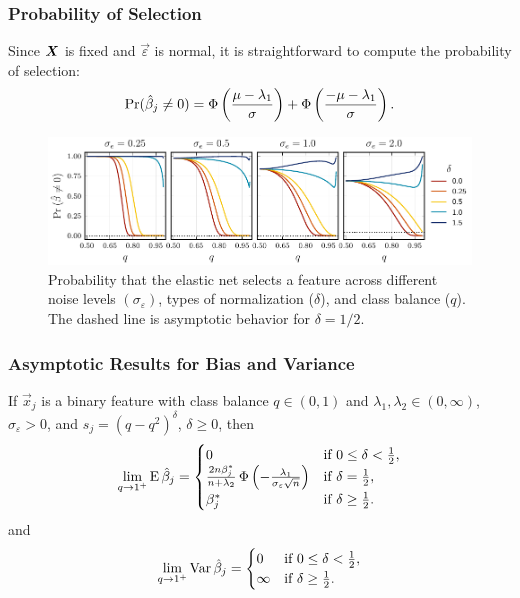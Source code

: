 \documentclass[10pt]{beamer}
\begin{document}
\begin{frame}[c]
  \frametitle{Probability of Selection}

  Since \(\boldsymbol{X}\) is fixed and \(\vec{\varepsilon}\) is normal, it is straightforward to
  compute the probability of selection:
  \[
    \Pr(\hat{\beta}_j \neq 0) = \operatorname{\Phi}\left(\frac{\mu - \lambda_1}{\sigma}\right) + \operatorname{\Phi}\left(\frac{- \mu -\lambda_1}{\sigma}\right).
  \]

  \begin{figure}[htpb]
    \centering
    \includegraphics[width=\textwidth]{figures/selection_probability.pdf}
    \caption{%
      Probability that the elastic net selects a feature across different noise levels \((\sigma_\varepsilon)\), types of normalization (\(\delta\)), and class balance (\(q\)).
      The dashed line is asymptotic behavior for \(\delta = 1/2\).
    }
  \end{figure}
\end{frame}

\begin{frame}[c]
  \frametitle{Asymptotic Results for Bias and Variance}

  \begin{theorem}
    If \(\vec{x}_j\) is a binary feature with class balance \(q \in (0, 1)\) and \(\lambda_1,\lambda_2 \in (0,\infty)\), \(\sigma_\varepsilon > 0\), and \(s_j = (q - q^2)^{\delta}\), \(\delta \geq 0\), then
    \[
      \lim_{q \rightarrow 1^+} \operatorname{E} \hat{\beta}_j =
      \begin{cases}
        0                                                                                                  & \text{if } 0 \leq \delta < \frac{1}{2}, \\
        \frac{2n \beta_j^*}{n + \lambda_2} \operatorname{\Phi}\left(-\frac{\lambda_1}{\sigma_\varepsilon \sqrt{n}}\right) & \text{if } \delta = \frac{1}{2},        \\
        \beta^*_j                                                                                          & \text{if } \delta \geq \frac{1}{2}.
      \end{cases}
    \]
    \pause and
    \[
      \lim_{q \rightarrow 1^+} \operatorname{Var} \hat{\beta}_j =
      \begin{cases}
        0      & \text{if } 0 \leq \delta < \frac{1}{2}, \\
        \infty & \text{if } \delta \geq \frac{1}{2}.
      \end{cases}
    \]
  \end{theorem}

\end{frame}
\end{document}
